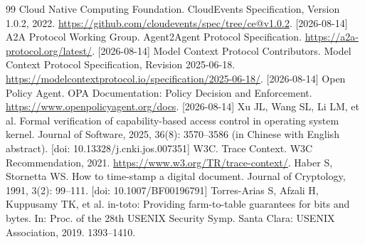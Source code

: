 {\begin{thebibliography}{99}
 Cloud Native Computing Foundation. CloudEvents Specification, Version 1.0.2, 2022. \url{https://github.com/cloudevents/spec/tree/ce@v1.0.2}. [2026-08-14]
 A2A Protocol Working Group. Agent2Agent Protocol Specification. \url{https://a2a-protocol.org/latest/}. [2026-08-14]
 Model Context Protocol Contributors. Model Context Protocol Specification, Revision 2025-06-18. \url{https://modelcontextprotocol.io/specification/2025-06-18/}. [2026-08-14]
 Open Policy Agent. OPA Documentation: Policy Decision and Enforcement. \url{https://www.openpolicyagent.org/docs}. [2026-08-14]
 Xu JL, Wang SL, Li LM, et al. Formal verification of capability-based access control in operating system kernel. Journal of Software, 2025, 36(8): 3570--3586 (in Chinese with English abstract). [doi: 10.13328/j.cnki.jos.007351]
 W3C. Trace Context. W3C Recommendation, 2021. \url{https://www.w3.org/TR/trace-context/}.
 Haber S, Stornetta WS. How to time-stamp a digital document. Journal of Cryptology, 1991, 3(2): 99--111. [doi: 10.1007/BF00196791]
 Torres-Arias S, Afzali H, Kuppusamy TK, et al. in-toto: Providing farm-to-table guarantees for bits and bytes. In: Proc. of the 28th USENIX Security Symp. Santa Clara: USENIX Association, 2019. 1393--1410.
\end{thebibliography}
}
